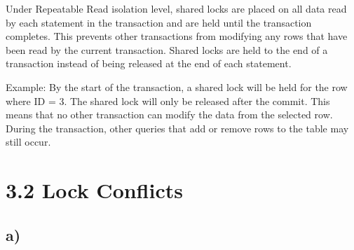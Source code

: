\documentclass[ngerman]{dis-template-add}
\begin{document}
Under Repeatable Read isolation level, shared locks are placed on all data read by each statement in the transaction and are held until the transaction completes.
This prevents other transactions from modifying any rows that have been read by the current transaction.
Shared locks are held to the end of a transaction instead of being released at the end of each statement.

Example:
By the start of the transaction, a shared lock will be held for the row where ID = 3. The shared lock will only be released after the commit. This means that no other transaction can modify the data from the selected row.
During the transaction, other queries that add or remove rows to the table may still occur.






\section*{3.2 Lock Conflicts}

\subsection*{a)}
\end{document}
